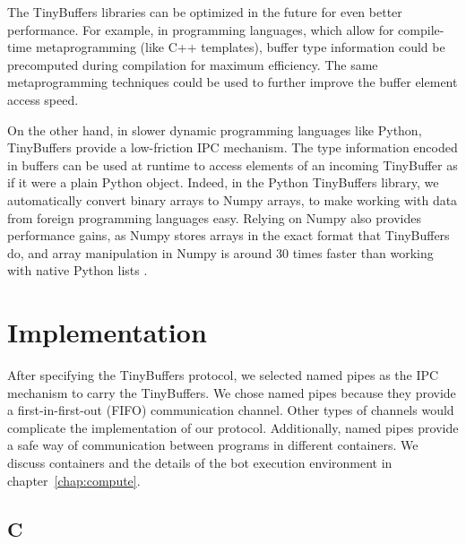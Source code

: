 The TinyBuffers libraries can be optimized in the future for even better performance. For example, in programming languages, which allow for compile-time metaprogramming (like C++ templates), buffer type information could be precomputed during compilation for maximum efficiency. The same metaprogramming techniques could be used to further improve the buffer element access speed.

On the other hand, in slower dynamic programming languages like Python, TinyBuffers provide a low-friction IPC mechanism. The type information encoded in buffers can be used at runtime to access elements of an incoming TinyBuffer as if it were a plain Python object. Indeed, in the Python TinyBuffers library, we automatically convert binary arrays to Numpy arrays, to make working with data from foreign programming languages easy. Relying on Numpy also provides performance gains, as Numpy stores arrays in the exact format that TinyBuffers do, and array manipulation in Numpy is around 30 times faster than working with native Python lists \cite{Ross2014}.

\section{Implementation}

After specifying the TinyBuffers protocol, we selected named pipes as the IPC mechanism to carry the TinyBuffers. We chose named pipes because they provide a first-in-first-out (FIFO) communication channel. Other types of channels would complicate the implementation of our protocol. Additionally, named pipes provide a safe way of communication between programs in different containers. We discuss containers and the details of the bot execution environment in chapter~\ref{chap:compute}.

\subsection{C}

